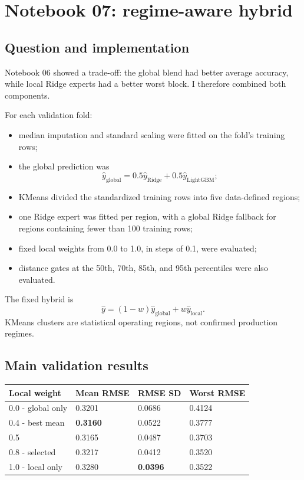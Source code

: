 \documentclass[10pt,a4paper]{article}
\begin{document}
\section{Notebook 07: regime-aware hybrid}

\subsection*{Question and implementation}

Notebook 06 showed a trade-off: the global blend had better average accuracy, while local Ridge experts had a better worst block. I therefore combined both components.

For each validation fold:
\begin{itemize}
  \item median imputation and standard scaling were fitted on the fold's training rows;
  \item the global prediction was
  \[
    \hat y_{\mathrm{global}}=0.5\hat y_{\mathrm{Ridge}}+0.5\hat y_{\mathrm{LightGBM}};
  \]
  \item KMeans divided the standardized training rows into five data-defined regions;
  \item one Ridge expert was fitted per region, with a global Ridge fallback for regions containing fewer than 100 training rows;
  \item fixed local weights from 0.0 to 1.0, in steps of 0.1, were evaluated;
  \item distance gates at the 50th, 70th, 85th, and 95th percentiles were also evaluated.
\end{itemize}

The fixed hybrid is
\[
\hat y=(1-w)\hat y_{\mathrm{global}}+w\hat y_{\mathrm{local}}.
\]
KMeans clusters are statistical operating regions, not confirmed production regimes.

\subsection*{Main validation results}

\begin{tabularx}{\textwidth}{Y L{0.15\textwidth}L{0.15\textwidth}L{0.15\textwidth}}
\toprule
\textbf{Local weight} & \textbf{Mean RMSE} & \textbf{RMSE SD} & \textbf{Worst RMSE} \\
 - global only & 0.3201 & 0.0686 & 0.4124 \\
0.4 - best mean & \textbf{0.3160} & 0.0522 & 0.3777 \\
0.5 & 0.3165 & 0.0487 & 0.3703 \\
0.8 - selected & 0.3217 & 0.0412 & 0.3520 \\
1.0 - local only & 0.3280 & \textbf{0.0396} & 0.3522 \\
\bottomrule
\end{tabularx}
\end{document}
